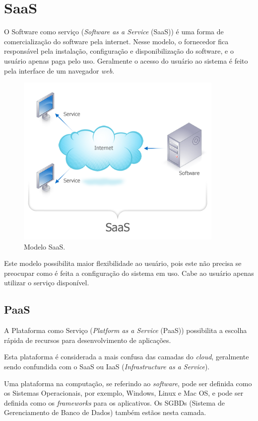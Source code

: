 \documentclass{abnt}
\begin{document}
	\chapter{SaaS}
	
	O Software como serviço (\textit{Software as a Service} (SaaS)) é uma forma 
	de comercialização do software pela internet. Nesse modelo, o fornecedor 
	fica responsável pela instalação, configuração e disponibilização do 
	software, e o usuário apenas paga pelo uso.
	Geralmente o acesso do usuário ao sistema é feito pela interface 
	de um navegador \textit{web}.

	\begin{figure}[h]
		\centering
		\includegraphics[width=10cm, keepaspectratio]{img/SaaS.png}
		\caption{Modelo SaaS.}
		\label{saas}
	\end{figure}
	
	Este modelo possibilita maior flexibilidade ao usuário, pois este não 
	precisa se preocupar como é feita a configuração do sistema em uso. Cabe 
	ao usuário apenas utilizar o serviço disponível.
	
	\section{PaaS}
		A Plataforma como Serviço (\textit{Platform as a Service} (PaaS)) possibilita a escolha rápida de recursos para desenvolvimento de aplicações.
		
		Esta plataforma é considerada a mais confusa das camadas do \textit{cloud}, geralmente sendo confundida com o SaaS ou IaaS (\textit{Infrastructure as a Service}).
		
		Uma plataforma na computação, se referindo ao \textit{software}, pode ser definida como os Sistemas Operacionais, por exemplo, Windows\texttrademark , Linux e Mac OS, e pode ser definida como os \textit{frameworks} para os aplicativos. Os SGBDs (Sistema de Gerenciamento de Banco de Dados) também estãos nesta camada.
	
\end{document}
